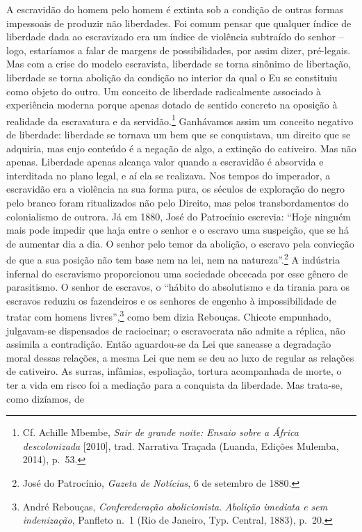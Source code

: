 A escravidão do homem pelo homem é extinta sob a condição de outras
formas impessoais de produzir não liberdades. Foi comum pensar que
qualquer índice de liberdade dada ao escravizado era um índice de
violência subtraído do senhor -- logo, estaríamos a falar de margens de
possibilidades, por assim dizer, pré-legais. Mas com a crise do modelo
escravista, liberdade se torna sinônimo de libertação, liberdade se
torna abolição da condição no interior da qual o Eu se constituiu como
objeto do outro. Um conceito de liberdade radicalmente associado à
experiência moderna porque apenas dotado de sentido concreto na oposição
à realidade da escravatura e da servidão.\footnote{Cf. Achille Mbembe,
  \emph{Sair de grande noite: Ensaio sobre a África descolonizada}
  {[}2010{]}, trad. Narrativa Traçada (Luanda, Edições Mulemba, 2014),
  p.~53.} Ganhávamos assim um conceito negativo de liberdade: liberdade
se tornava um bem que se conquistava, um direito que se adquiria, mas
cujo conteúdo é a negação de algo, a extinção do cativeiro. Mas não
apenas. Liberdade apenas alcança valor quando a escravidão é absorvida e
interditada no plano legal, e aí ela se realizava. Nos tempos do
imperador, a escravidão era a violência na sua forma pura, os séculos de
exploração do negro pelo branco foram ritualizados não pelo Direito, mas
pelos transbordamentos do colonialismo de outrora. Já em 1880, José do
Patrocínio escrevia: ``Hoje ninguém mais pode impedir que haja entre o
senhor e o escravo uma suspeição, que se há de aumentar dia a dia. O
senhor pelo temor da abolição, o escravo pela convicção de que a sua
posição não tem base nem na lei, nem na natureza''.\footnote{José do
  Patrocínio, \emph{Gazeta de Notícias}, 6 de setembro de 1880.} A
indústria infernal do escravismo proporcionou uma sociedade obcecada por
esse gênero de parasitismo. O senhor de escravos, o ``hábito do
absolutismo e da tirania para os escravos reduziu os fazendeiros e os
senhores de engenho à impossibilidade de tratar com homens
livres'',\footnote{André Rebouças, \emph{Conferederação abolicionista}.
  \emph{Abolição imediata e sem indenização}, Panfleto n.~1 (Rio de
  Janeiro, Typ. Central, 1883), p.~20.} como bem dizia Rebouças. Chicote
empunhado, julgavam-se dispensados de raciocinar; o escravocrata não
admite a réplica, não assimila a contradição. Então aguardou-se da Lei
que saneasse a degradação moral dessas relações, a mesma Lei que nem se
deu ao luxo de regular as relações de cativeiro. As surras, infâmias,
espoliação, tortura acompanhada de morte, o ter a vida em risco foi a
mediação para a conquista da liberdade. Mas trata-se, como dizíamos, de
